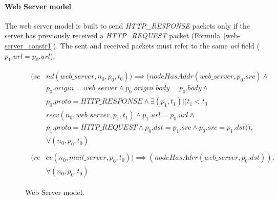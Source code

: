 \paragraph{Web Server model} The web server model is built to send \textit{HTTP\_RESPONSE} packets only if the server has previously received a \textit{HTTP\_REQUEST} packet (Formula~\ref{web-server_constr1}). The sent and received packets must refer to the same \textit{url} field (\textit{$p_{1}.url = p_{0}.url$}):
\begin{figure}[h]
	{\footnotesize
		\begin{subequations}
			\begin{align}
				\begin{split}
					\label{web-server_constr1}
					(se& nd(web\_server , n_{0}, p_{0}, t_{0})) \implies (nodeHasAddr(web\_server, p_{0}.src) \wedge \\
					& p_{0}.origin = web\_server \wedge p_{0}.origin\_body = p_{0}.body \wedge \\
					& p_{0}.proto = HTTP\_RESPONSE \wedge \exists (p_{1}, t_{1}) | (t_{1} < t_{0} \\
					& recv(n_{0}, web\_server, p_{1}, t_{1}) \wedge p_{1}.url = p_{0}.url \wedge \\
					& p_{1}.proto = HTTP\_REQUEST \wedge p_{0}.dst = p_{1}.src \wedge p_{0}.src = p_{1}.dst)), \\
					& \forall (n_{0}, p_{0}, t_{0})
				\end{split} \\
				\begin{split}
					\label{web-server_constr2}
					(re& cv( n_{0}, mail\_server, p_{0}, t_{0})) \implies (nodeHasAdrr(web\_server, p_{0}.dst)),\\
					& \forall (n_{0}, p_{0}, t_{0})
				\end{split} 
			\end{align}
		\end{subequations}
	}%
	\caption{Web Server model.}
	\label{web-server_model}
\end{figure}

